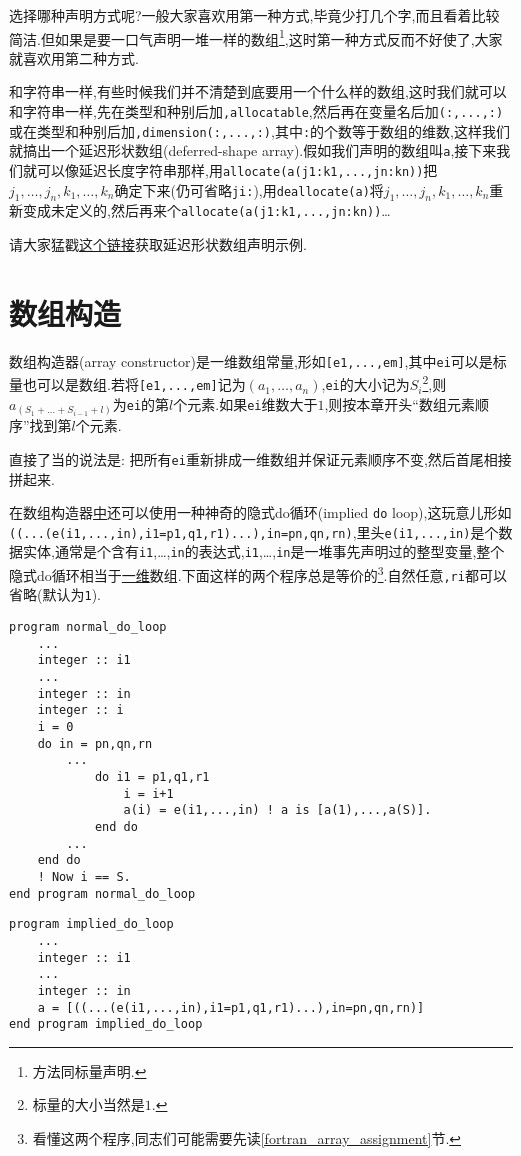 选择哪种声明方式呢?一般大家喜欢用第一种方式,毕竟少打几个字,而且看着比较简洁.但如果是要一口气声明一堆一样的数组\footnote{
    方法同标量声明.
},这时第一种方式反而不好使了,大家就喜欢用第二种方式.

和字符串一样,有些时候我们并不清楚到底要用一个什么样的数组,这时我们就可以和字符串一样,先在类型和种别后加\texttt{,allocatable},然后再在变量名后加\texttt{(:,...,:)}或在类型和种别后加\texttt{,dimension(:,...,:)},其中\texttt{:}的个数等于数组的维数,这样我们就搞出一个延迟形状数组(deferred-shape array).假如我们声明的数组叫\texttt{a},接下来我们就可以像延迟长度字符串那样,用\texttt{allocate(a(j1:k1,...,jn:kn))}把$j_1,\dots,j_n,k_1,\dots,k_n$确定下来(仍可省略\texttt{ji:}),用\texttt{deallocate(a)}将$j_1,\dots,j_n,k_1,\dots,k_n$重新变成未定义的,然后再来个\texttt{allocate(a(j1:k1,...,jn:kn))}\dots

请大家猛戳\href{https://fortran-lang.org/learn/quickstart/arrays_strings#allocatable-dynamic-arrays}{这个链接}获取延迟形状数组声明示例.

\section{数组构造}

数组构造器(array constructor)是一维数组常量,形如\texttt{[e1,...,em]},其中\texttt{ei}可以是标量也可以是数组.若将\texttt{[e1,...,em]}记为$(a_1,\dots,a_n)$,\texttt{ei}的大小记为$S_i$\footnote{
    标量的大小当然是$1$.
},则$a_{(S_1+\dots+S_{i-1}+l)}$为\texttt{ei}的第$l$个元素.如果\texttt{ei}维数大于$1$,则按本章开头``数组元素顺序''找到第$l$个元素.

直接了当的说法是: 把所有\texttt{ei}重新排成一维数组并保证元素顺序不变,然后首尾相接拼起来.

在数组构造器\uline{中}还可以使用一种神奇的隐式do循环(implied \texttt{do} loop),这玩意儿形如\texttt{((...(e(i1,...,in),i1=p1,q1,r1)...),in=pn,qn,rn)},里头\texttt{e(i1,...,in)}是个数据实体,通常是个含有\texttt{i1},\dots,\texttt{in}的表达式,\texttt{i1},\dots,\texttt{in}是一堆事先声明过的整型变量,整个隐式do循环相当于\uline{一维}数组.下面这样的两个程序总是等价的\footnote{
看懂这两个程序,同志们可能需要先读\ref{fortran_array_assignment}节.
}.自然任意\texttt{,ri}都可以省略(默认为\texttt{1}).
\begin{lstlisting}
program normal_do_loop
    ...
    integer :: i1
    ...
    integer :: in
    integer :: i
    i = 0
    do in = pn,qn,rn
        ...
            do i1 = p1,q1,r1
                i = i+1
                a(i) = e(i1,...,in) ! a is [a(1),...,a(S)].
            end do
        ...
    end do
    ! Now i == S.
end program normal_do_loop
\end{lstlisting}
\begin{lstlisting}
program implied_do_loop
    ...
    integer :: i1
    ...
    integer :: in
    a = [((...(e(i1,...,in),i1=p1,q1,r1)...),in=pn,qn,rn)]
end program implied_do_loop
\end{lstlisting}

